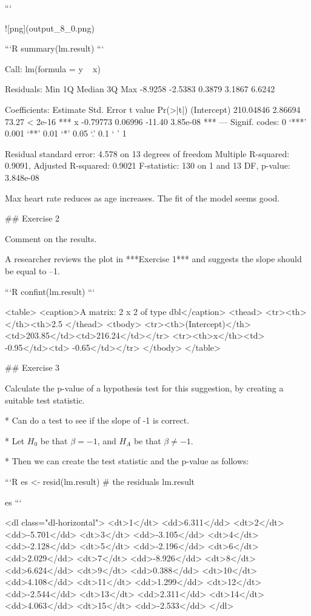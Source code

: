 ```


![png](output_8_0.png)



```R
summary(lm.result)
```


    
    Call:
    lm(formula = y ~ x)
    
    Residuals:
        Min      1Q  Median      3Q     Max 
    -8.9258 -2.5383  0.3879  3.1867  6.6242 
    
    Coefficients:
                 Estimate Std. Error t value Pr(>|t|)    
    (Intercept) 210.04846    2.86694   73.27  < 2e-16 ***
    x            -0.79773    0.06996  -11.40 3.85e-08 ***
    ---
    Signif. codes:  0 ‘***’ 0.001 ‘**’ 0.01 ‘*’ 0.05 ‘.’ 0.1 ‘ ’ 1
    
    Residual standard error: 4.578 on 13 degrees of freedom
    Multiple R-squared:  0.9091,	Adjusted R-squared:  0.9021 
    F-statistic:   130 on 1 and 13 DF,  p-value: 3.848e-08



Max heart rate reduces as age increases. The fit of the model seems good.

## Exercise 2

Comment on the results.

A researcher reviews the plot in ***Exercise 1*** and suggests the slope should be equal to –1.


```R
confint(lm.result) %
```


<table>
<caption>A matrix: 2 x 2 of type dbl</caption>
<thead>
	<tr><th></th><th>2.5 %
</thead>
<tbody>
	<tr><th>(Intercept)</th><td>203.85</td><td>216.24</td></tr>
	<tr><th>x</th><td> -0.95</td><td> -0.65</td></tr>
</tbody>
</table>



## Exercise 3

Calculate the p-value of a hypothesis test for this suggestion, by creating a suitable test statistic.


* Can do a test to see if the slope of -1 is correct. 


* Let $H_0$ be that $\beta = -1$, and $H_A$ be that $\beta \neq -1 $. 


* Then we can create the test statistic and the p-value as follows:



```R
es <- resid(lm.result)
# the residuals lm.result

es %
```


<dl class="dl-horizontal">
	<dt>1</dt>
		<dd>6.311</dd>
	<dt>2</dt>
		<dd>-5.701</dd>
	<dt>3</dt>
		<dd>-3.105</dd>
	<dt>4</dt>
		<dd>-2.128</dd>
	<dt>5</dt>
		<dd>-2.196</dd>
	<dt>6</dt>
		<dd>2.029</dd>
	<dt>7</dt>
		<dd>-8.926</dd>
	<dt>8</dt>
		<dd>6.624</dd>
	<dt>9</dt>
		<dd>0.388</dd>
	<dt>10</dt>
		<dd>4.108</dd>
	<dt>11</dt>
		<dd>1.299</dd>
	<dt>12</dt>
		<dd>-2.544</dd>
	<dt>13</dt>
		<dd>2.311</dd>
	<dt>14</dt>
		<dd>4.063</dd>
	<dt>15</dt>
		<dd>-2.533</dd>
</dl>




